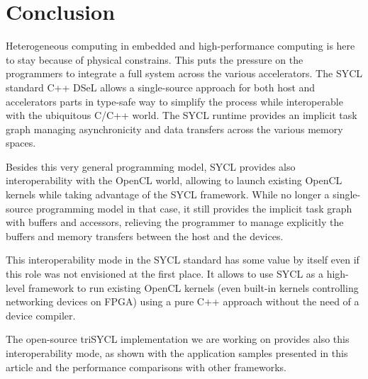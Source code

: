 \documentclass[sigplan, review]{acmart}
\begin{document}
\section{Conclusion}
\label{sec:conclusion}

Heterogeneous computing in embedded and high-performance computing is
here to stay because of physical constrains. This puts the pressure on
the programmers to integrate a full system across the various
accelerators. The SYCL standard C++ DSeL allows a single-source
approach for both host and accelerators parts in type-safe way to
simplify the process while interoperable with the ubiquitous C/C++
world. The SYCL runtime provides an implicit task graph managing
asynchronicity and data transfers across the various memory spaces.

Besides this very general programming model, SYCL provides also
interoperability with the OpenCL world, allowing to launch existing
OpenCL kernels while taking advantage of the SYCL framework. While no
longer a single-source programming model in that case, it still
provides the implicit task graph with buffers and accessors, relieving
the programmer to manage explicitly the buffers and memory transfers
between the host and the devices.

This interoperability mode in the SYCL standard has some value by
itself even if this role was not envisioned at the first place. It
allows to use SYCL as a high-level framework to run existing OpenCL
kernels (even built-in kernels controlling networking devices on
FPGA) using a pure C++ approach without the need of a device compiler.

The open-source triSYCL implementation \cite{triSYCL} we are working
on provides also this interoperability mode, as shown with the
application samples presented in this article and the performance
comparisons with other frameworks.





\end{document}
